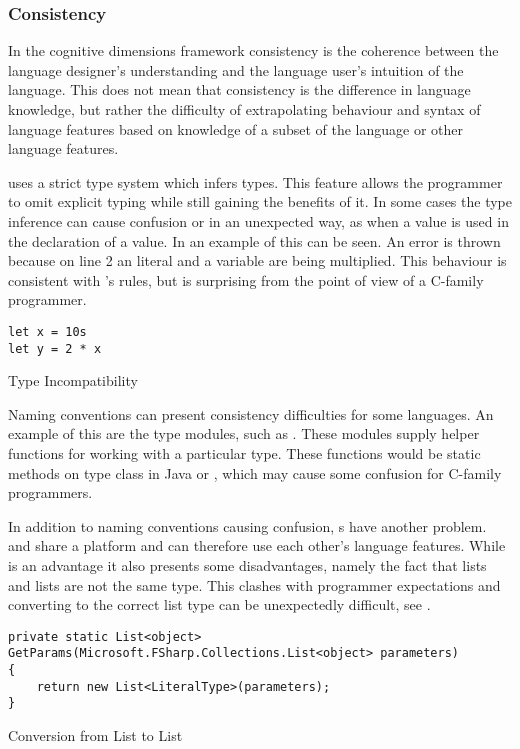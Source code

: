 \subsubsection{Consistency}
In the cognitive dimensions framework consistency is the coherence between the language designer's understanding and the language user's intuition of the language\cite{green1996usability}. This does not mean that consistency is the difference in language knowledge, but rather the difficulty of extrapolating behaviour and syntax of language features based on knowledge of a subset of the language or other language features.

\fs uses a strict type system which infers types. This feature allows the programmer to omit explicit typing while still gaining the benefits of it. In some cases the type inference can cause confusion or in an unexpected way, as when a  value is used in the declaration of a  value. In  an example of this can be seen. An error is thrown because on line 2 an  literal and a  variable are being multiplied. This behaviour is consistent with \fs's rules, but is surprising from the point of view of a C-family programmer.

\begin{listing}[H]
\begin{verbatim}
let x = 10s
let y = 2 * x
\end{verbatim}
\caption{Type Incompatibility}
\label{lst:type-incompat}
\end{listing}

Naming conventions can present consistency difficulties for some languages. An example of this are the type modules, such as . These modules supply helper functions for working with a particular type. These functions would be static methods on type class in Java or \cs, which may cause some confusion for C-family programmers.

In addition to naming conventions causing confusion, s have another problem. \fs and \cs share a platform and can therefore use each other's language features. While is an advantage it also presents some disadvantages, namely the fact that \fs lists and \cs lists are not the same type. This clashes with programmer expectations and converting to the correct list type can be unexpectedly difficult, see .

\begin{listing}[H]
\begin{verbatim}
private static List<object> GetParams(Microsoft.FSharp.Collections.List<object> parameters)
{
    return new List<LiteralType>(parameters);
}
\end{verbatim}
\caption{Conversion from \fs List to \cs List}
\label{lst:list-conv}
\end{listing}

